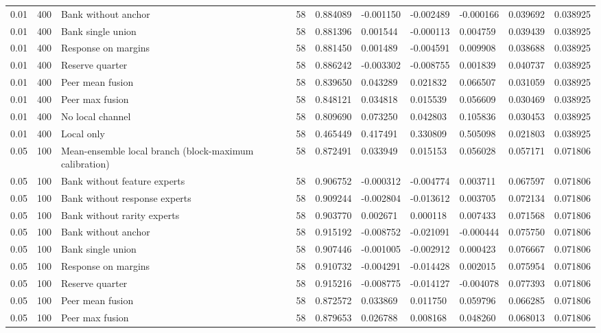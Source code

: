 \begin{tabular}{llllllllll}
0.01 & 400 & Bank without anchor & 58 & 0.884089 & -0.001150 & -0.002489 & -0.000166 & 0.039692 & 0.038925 \\
0.01 & 400 & Bank single union & 58 & 0.881396 & 0.001544 & -0.000113 & 0.004759 & 0.039439 & 0.038925 \\
0.01 & 400 & Response on margins & 58 & 0.881450 & 0.001489 & -0.004591 & 0.009908 & 0.038688 & 0.038925 \\
0.01 & 400 & Reserve quarter & 58 & 0.886242 & -0.003302 & -0.008755 & 0.001839 & 0.040737 & 0.038925 \\
0.01 & 400 & Peer mean fusion & 58 & 0.839650 & 0.043289 & 0.021832 & 0.066507 & 0.031059 & 0.038925 \\
0.01 & 400 & Peer max fusion & 58 & 0.848121 & 0.034818 & 0.015539 & 0.056609 & 0.030469 & 0.038925 \\
0.01 & 400 & No local channel & 58 & 0.809690 & 0.073250 & 0.042803 & 0.105836 & 0.030453 & 0.038925 \\
0.01 & 400 & Local only & 58 & 0.465449 & 0.417491 & 0.330809 & 0.505098 & 0.021803 & 0.038925 \\
0.05 & 100 & Mean-ensemble local branch (block-maximum calibration) & 58 & 0.872491 & 0.033949 & 0.015153 & 0.056028 & 0.057171 & 0.071806 \\
0.05 & 100 & Bank without feature experts & 58 & 0.906752 & -0.000312 & -0.004774 & 0.003711 & 0.067597 & 0.071806 \\
0.05 & 100 & Bank without response experts & 58 & 0.909244 & -0.002804 & -0.013612 & 0.003705 & 0.072134 & 0.071806 \\
0.05 & 100 & Bank without rarity experts & 58 & 0.903770 & 0.002671 & 0.000118 & 0.007433 & 0.071568 & 0.071806 \\
0.05 & 100 & Bank without anchor & 58 & 0.915192 & -0.008752 & -0.021091 & -0.000444 & 0.075750 & 0.071806 \\
0.05 & 100 & Bank single union & 58 & 0.907446 & -0.001005 & -0.002912 & 0.000423 & 0.076667 & 0.071806 \\
0.05 & 100 & Response on margins & 58 & 0.910732 & -0.004291 & -0.014428 & 0.002015 & 0.075954 & 0.071806 \\
0.05 & 100 & Reserve quarter & 58 & 0.915216 & -0.008775 & -0.014127 & -0.004078 & 0.077393 & 0.071806 \\
0.05 & 100 & Peer mean fusion & 58 & 0.872572 & 0.033869 & 0.011750 & 0.059796 & 0.066285 & 0.071806 \\
0.05 & 100 & Peer max fusion & 58 & 0.879653 & 0.026788 & 0.008168 & 0.048260 & 0.068013 & 0.071806 \\

\end{tabular}
